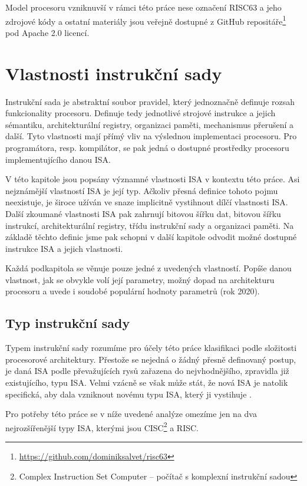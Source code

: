 \documentclass[
  digital, %
  color,   %
  table,   %
  twoside, %
  nolof,   %
  nolot,   %
]{fithesis3}
\begin{document}
Model procesoru vzniknuvší v rámci této práce nese označení RISC63 a jeho zdrojové kódy a ostatní materiály jsou veřejně dostupné z GitHub repositáře\footnote{\url{https://github.com/dominiksalvet/risc63}} pod Apache 2.0 licencí.

\chapter{Vlastnosti instrukční sady}
Instrukční sada je abstraktní soubor pravidel, který jednoznačně definuje rozsah funkcionality procesoru. Definuje tedy jednotlivé strojové instrukce a jejich sémantiku, architekturální registry, organizaci paměti, mechanismus přerušení a další. Tyto vlastnosti mají přímý vliv na výslednou implementaci procesoru. Pro programátora, resp. kompilátor, se pak jedná o dostupné prostředky procesoru implementujícího danou ISA.

V této kapitole jsou popsány významné vlastnosti ISA v kontextu této práce. Asi nejznámější vlastností ISA je její typ. Ačkoliv přesná definice tohoto pojmu neexistuje, je široce užíván ve snaze implicitně vystihnout dílčí vlastnosti ISA. Další zkoumané vlastnosti ISA pak zahrnují bitovou šířku dat, bitovou šířku instrukcí, architekturální registry, třídu instrukční sady a organizaci paměti. Na základě těchto definic jsme pak schopni v další kapitole odvodit možné dostupné instrukce ISA a jejich vlastnosti.

Každá podkapitola se věnuje pouze jedné z uvedených vlastností. Popíše danou vlastnost, jak se obvykle volí její parametry, možný dopad na architekturu procesoru a uvede i soudobé populární hodnoty parametrů (rok 2020).

\section{Typ instrukční sady}
Typem instrukční sady rozumíme pro účely této práce klasifikaci podle složitosti procesorové architektury. Přestože se nejedná o žádný přesně definovaný postup, je daná ISA podle převažujících rysů zařazena do nejvhodnějšího, zpravidla již existujícího, typu ISA. Velmi vzácně se však může stát, že nová ISA je natolik specifická, aby dala vzniknout novému typu ISA, který ji vystihuje \parencite{burger04}.

Pro potřeby této práce se v níže uvedené analýze omezíme jen na dva nejrozšířenější typy ISA, kterými jsou CISC\footnote{Complex Instruction Set Computer -- počítač s komplexní instrukční sadou} a RISC.
\end{document}
